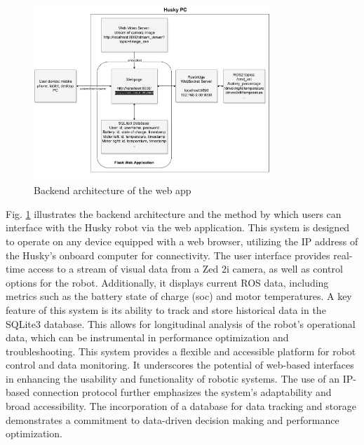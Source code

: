 \documentclass[conference]{IEEEtran}
\begin{document}
\begin{figure}[htbp]
    \centerline{\includegraphics[width=8.9cm]{Pictures/userapp.pdf}}
    \caption{Backend architecture of the web app}
    \label{fig:userapp}
\end{figure}
Fig. \ref{fig:userapp} illustrates the backend architecture and the method by which users can interface with the Husky robot via the web application. This system is designed to operate on any device equipped with a web browser, utilizing the IP address of the Husky's onboard computer for connectivity.
The user interface provides real-time access to a stream of visual data from a Zed 2i camera, as well as control options for the robot. Additionally, it displays current ROS data, including metrics such as the battery state of charge (soc) and motor temperatures.
A key feature of this system is its ability to track and store historical data in the SQLite3 database. This allows for longitudinal analysis of the robot's operational data, which can be instrumental in performance optimization and troubleshooting.
This system provides a flexible and accessible platform for robot control and data monitoring. It underscores the potential of web-based interfaces in enhancing the usability and functionality of robotic systems. 
The use of an IP-based connection protocol further emphasizes the system's adaptability and broad accessibility. The incorporation of a database for data tracking and storage demonstrates a commitment to data-driven decision making and performance optimization. 
\end{document}
